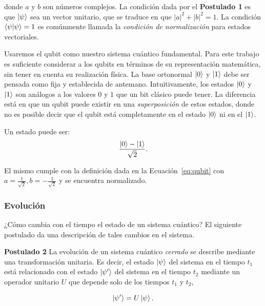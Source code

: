 donde $a$ y $b$ son números complejos. La condición dada por el \textbf{Postulado 1} es que $\ket{\psi}$ sea un vector unitario, que se traduce en que $|a|^2+|b|^2=1$. La condición $\braket{\psi|\psi}=1$ es comúnmente llamada la \emph{condición de normalización} para estados vectoriales.

Usaremos el qubit como nuestro sistema cuántico fundamental. Para este trabajo es suficiente considerar a los qubits en términos de su representación matemática, sin tener en cuenta su realización física. La base ortonormal $\ket{0}$ y $\ket{1}$ debe ser pensada como fija y establecida de antemano. Intuitivamente, los estados $\ket{0}$ y $\ket{1}$ son análogos a los valores $0$ y $1$ que un bit clásico puede tener. La diferencia está en que un qubit puede existir en una \emph{superposición} de estos estados, donde no es posible decir que el qubit está completamente en el estado  $\ket{0}$ ni en el $\ket{1}$.

\begin{ejemplo}
Un estado puede ser:
\begin{equation*}
    \frac{\ket{0}-\ket{1}}{\sqrt{2}}.
\end{equation*}

El mismo cumple con la definición dada en la Ecuación~\ref{eq:qubit} con $a=\frac{1}{\sqrt{2}}, b=-\frac{1}{\sqrt{2}}$ y se encuentra normalizado.

\end{ejemplo}

\subsubsection{Evolución}

¿Cómo cambia con el tiempo el estado de un sistema cuántico? El siguiente postulado da una descripción de tales cambios en el sistema.

\begin{displayquote}
    \textbf{Postulado 2}
    La evolución de un sistema cuántico \emph{cerrado} se describe mediante una transformación unitaria. Es decir, el estado $\ket{\psi}$ del sistema en el tiempo $t_1$ está relacionado con el estado $\ket{\psi'}$ del sistema en el tiempo $t_2$ mediante un operador unitario $U$ que depende solo de los tiempos $t_1$ y $t_2$,

    \begin{equation}
        \ket{\psi'} = U\ket{\psi}.
    \end{equation}
\end{displayquote}

